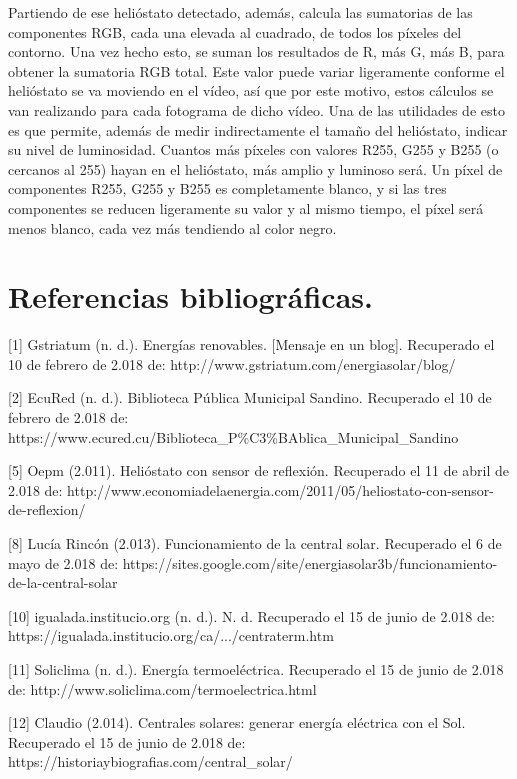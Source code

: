 \documentclass[12pt]{article}
\begin{document}
Partiendo de ese helióstato detectado, además, calcula las sumatorias de las componentes RGB, cada una elevada al cuadrado, de todos los píxeles del contorno. Una vez hecho esto, se suman los resultados de R, más G, más B, para obtener la sumatoria RGB total. Este valor puede variar ligeramente conforme el helióstato se va moviendo en el vídeo, así que por este motivo, estos cálculos se van realizando para cada fotograma de dicho vídeo. Una de las utilidades de esto es que permite, además de medir indirectamente el tamaño del helióstato, indicar su nivel de luminosidad. Cuantos más píxeles con valores R255, G255 y B255 (o cercanos al 255) hayan en el helióstato, más amplio y luminoso será. Un píxel de componentes R255, G255 y B255 es completamente blanco, y si las tres componentes se reducen ligeramente su valor y al mismo tiempo, el píxel será menos blanco, cada vez más tendiendo al color negro.
 




\section{Referencias bibliográficas.}

[1] Gstriatum (n. d.). Energías renovables. [Mensaje en un blog]. Recuperado el 10 de febrero de 2.018 de: http://www.gstriatum.com/energiasolar/blog/

[2] EcuRed (n. d.). Biblioteca Pública Municipal Sandino. Recuperado el 10 de febrero de 2.018 de: https://www.ecured.cu/Biblioteca\_P\%C3\%BAblica\_Municipal\_Sandino

[5] Oepm (2.011). Helióstato con sensor de reflexión. Recuperado el 11 de abril de 2.018 de: http://www.economiadelaenergia.com/2011/05/heliostato-con-sensor-de-reflexion/

[8] Lucía Rincón (2.013). Funcionamiento de la central solar. Recuperado el 6 de mayo de 2.018 de: https://sites.google.com/site/energiasolar3b/funcionamiento-de-la-central-solar

[10] igualada.institucio.org (n. d.). N. d. Recuperado el 15 de junio de 2.018 de: https://igualada.institucio.org/ca/.../centraterm.htm

[11] Soliclima (n. d.). Energía termoeléctrica. Recuperado el 15 de junio de 2.018 de: http://www.soliclima.com/termoelectrica.html

[12] Claudio (2.014). Centrales solares: generar energía eléctrica con el Sol. Recuperado el 15 de junio de 2.018 de: https://historiaybiografias.com/central\_solar/
\end{document}

